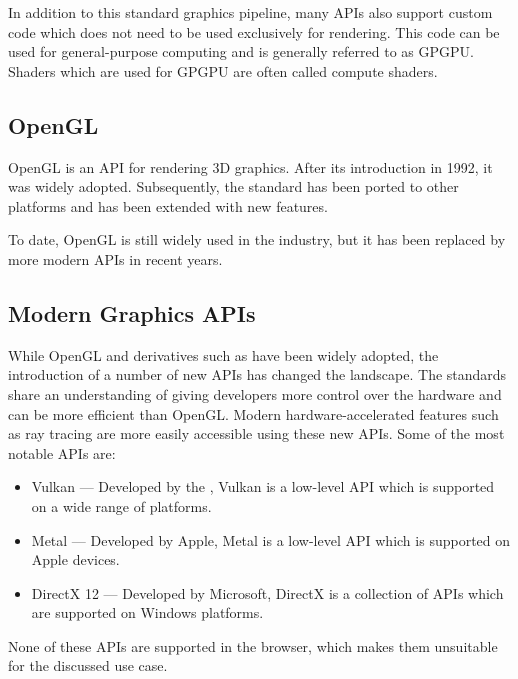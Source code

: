 In addition to this standard graphics pipeline, many \glspl{API} also support custom code which does not need to be used exclusively for rendering. This code can be used for general-purpose computing and is generally referred to as \gls{GPGPU}. Shaders which are used for \gls{GPGPU} are often called compute shaders.

\subsection{OpenGL}

\gls{OpenGL} is an \gls{API} for rendering 3D graphics. After its introduction in 1992, it was widely adopted. Subsequently, the standard has been ported to other platforms and has been extended with new features.

To date, \gls{OpenGL} is still widely used in the industry, but it has been replaced by more modern \glspl{API} in recent years.

\subsection{Modern Graphics APIs}

While \gls{OpenGL} and derivatives such as  have been widely adopted, the introduction of a number of new \glspl{API} has changed the landscape. The standards share an understanding of giving developers more control over the hardware and can be more efficient than \gls{OpenGL}. Modern hardware-accelerated features such as ray tracing are more easily accessible using these new \glspl{API}. Some of the most notable \glspl{API} are:

\begin{itemize}
    \item{Vulkan} — Developed by the , Vulkan is a low-level \gls{API} which is supported on a wide range of platforms.
    \item{Metal} — Developed by Apple, Metal is a low-level \gls{API} which is supported on Apple devices.
    \item{DirectX 12} — Developed by Microsoft, DirectX is a collection of \glspl{API} which are supported on Windows platforms.
\end{itemize}

None of these \glspl{API} are supported in the browser, which makes them unsuitable for the discussed use case.

